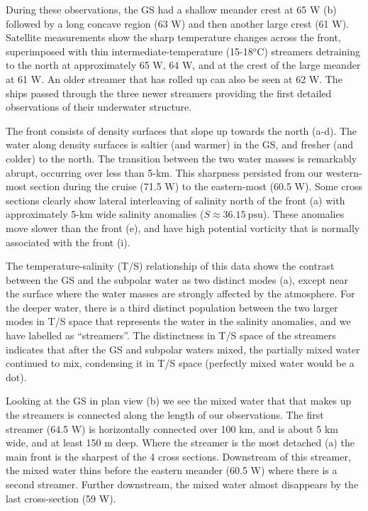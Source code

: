 \documentclass{article}
\begin{document}
During these observations, the GS had a shallow meander crest at 65 W (b)  followed by a long concave region (63 W) and then another large  crest (61 W).  Satellite measurements show the sharp temperature changes across the front, superimposed with thin intermediate-temperature (15-18$^o$C) streamers detraining to the north at approximately 65 W, 64 W, and at the crest of the large meander at 61 W.  An older streamer that has rolled up can also be seen at 62 W.  The ships passed through the three newer streamers providing the first detailed observations of their underwater structure.  

The front consists of density surfaces that slope up towards the north (a-d).  The water along density surfaces is saltier (and warmer) in the GS, and fresher (and colder) to the north. The transition between the two water masses is remarkably abrupt, occurring over less than 5-km.  This sharpness persisted from our western-most section during the cruise (71.5 W) to the eastern-most (60.5 W). Some cross sections clearly show lateral interleaving of salinity north of the front (a) with approximately 5-km wide salinity anomalies ($S \approx 36.15\ \mathrm{psu}$).  These anomalies move slower than the front (e), and have high potential vorticity that is normally associated with the front (i).  

The temperature-salinity (T/S) relationship of this data shows the contrast between the GS and the subpolar water as two distinct modes (a), except near the surface where the water masses are strongly affected by the atmosphere.  For the deeper water, there is a third distinct population between the two larger modes in T/S space that represents the water in the salinity anomalies, and we have labelled as ``streamers''.  The distinctness in T/S space of the streamers indicates that after the GS and subpolar waters mixed, the partially mixed water continued to mix, condensing it in T/S space (perfectly mixed water would be a dot).  

Looking at the GS in plan view (b) we see the mixed water that that makes up the streamers is connected along the length of our observations.  The first streamer (64.5 W) is horizontally connected over 100 km, and is about 5 km wide, and at least 150 m deep.  Where the streamer is the most detached (a) the main front is the sharpest of the 4 cross sections.    Downstream of this streamer, the mixed water thins before the eastern meander (60.5 W) where there is a second streamer.  Further downstream, the mixed water almost disappears by the last cross-section (59 W).  
\end{document}
